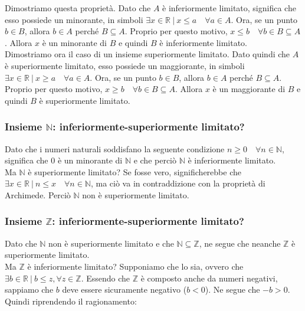 \documentclass{article}
\begin{document}
\noindent Dimostriamo questa proprietà. Dato che $A$ è inferiormente limitato, significa che esso possiede un minorante, in simboli $\exists x \in \mathbb{R} \ | \ x \leq a \quad \forall a \in A$. Ora, se un punto $b \in B$, allora $b \in A$ perché $B \subseteq A$. Proprio per questo motivo, $x \leq b \quad \forall b \in B \subseteq A$. Allora $x$ è un minorante di $B$ e quindi $B$ è inferiormente limitato. \\

\noindent Dimostriamo ora il caso di un insieme superiormente limitato. Dato quindi che $A$ è superiormente limitato, esso possiede un maggiorante, in simboli $\exists x \in \mathbb{R} \ | \ x \geq a \quad \forall a \in A$. Ora, se un punto $b \in B$, allora $b \in A$ perché $B \subseteq A$. Proprio per questo motivo, $x \geq b \quad \forall b \in B \subseteq A$. Allora $x$ è un maggiorante di $B$ e quindi $B$ è superiormente limitato.

\subsubsection{Insieme $\mathbb{N}$: inferiormente-superiormente limitato?}
Dato che i numeri naturali soddisfano la seguente condizione $n \geq 0 \quad \forall n \in \mathbb{N}$, significa che 0 è un minorante di $\mathbb{N}$ e che perciò $\mathbb{N}$ è inferiormente limitato.\\
Ma $\mathbb{N}$ è superiormente limitato? Se fosse vero, significherebbe che $\exists x \in \mathbb{R} \ | \ n \leq x \quad \forall n \in \mathbb{N}$, ma ciò va in contraddizione con la proprietà di Archimede. Perciò $\mathbb{N}$ non è superiormente limitato.

\subsubsection{Insieme $\mathbb{Z}$: inferiormente-superiormente limitato?}
Dato che $\mathbb{N}$ non è superiormente limitato e che $\mathbb{N} \subseteq \mathbb{Z}$, ne segue che neanche $\mathbb{Z}$ è superiormente limitato.\\

\noindent Ma $\mathbb{Z}$ è inferiormente limitato? Supponiamo che lo sia, ovvero che $\exists b \in \mathbb{R} \ | \ b \leq z, \forall z \in \mathbb{Z}$. Essendo che $\mathbb{Z}$ è composto anche da numeri negativi, sappiamo che $b$ deve essere sicuramente negativo ($b < 0$). Ne segue che $-b > 0$. Quindi riprendendo il ragionamento:
\end{document}
